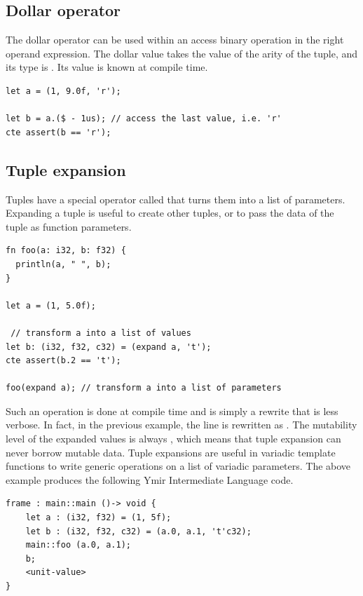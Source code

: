 \subsection{Dollar operator}

The dollar operator can be used within an access binary operation in the right
operand expression. The dollar value takes the value of the arity of the tuple,
and its type is . Its value is known at compile time.

\begin{lstlisting}[style=coloredverbatim]
let a = (1, 9.0f, 'r');

let b = a.($ - 1us); // access the last value, i.e. 'r'
cte assert(b == 'r');
\end{lstlisting}

\subsection{Tuple expansion}

Tuples have a special operator called  that turns them into a
list of parameters. Expanding a tuple is useful to create other tuples, or to
pass the data of the tuple as function parameters.

\begin{lstlisting}[style=coloredverbatim]
fn foo(a: i32, b: f32) {
  println(a, " ", b);
}

let a = (1, 5.0f);

 // transform a into a list of values
let b: (i32, f32, c32) = (expand a, 't');
cte assert(b.2 == 't');

foo(expand a); // transform a into a list of parameters
\end{lstlisting}

Such an operation is done at compile time and is simply a rewrite that is less
verbose. In fact, in the previous example, the line  is
rewritten as . The mutability level of the expanded
values is always , which means that tuple expansion can never borrow
mutable data. Tuple expansions are useful in variadic template functions to
write generic operations on a list of variadic parameters. The above example produces the following Ymir Intermediate Language code.

\begin{lstlisting}[style=myilVerb]
frame : main::main ()-> void {
    let a : (i32, f32) = (1, 5f);
    let b : (i32, f32, c32) = (a.0, a.1, 't'c32);
    main::foo (a.0, a.1);
    b;
    <unit-value>
}
\end{lstlisting}

